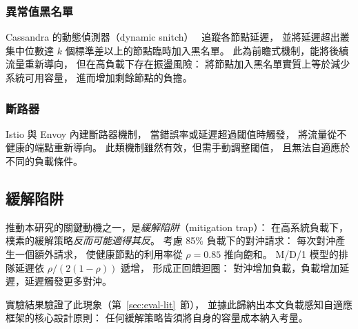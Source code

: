 \subsubsection*{異常值黑名單}

Cassandra 的動態偵測器（dynamic snitch）~\cite{lakshman2010cassandra}
追蹤各節點延遲，
並將延遲超出叢集中位數達 $k$ 個標準差以上的節點臨時加入黑名單。
此為前瞻式機制，能將後續流量重新導向，
但在高負載下存在振盪風險：
將節點加入黑名單實質上等於減少系統可用容量，
進而增加剩餘節點的負擔。

\subsubsection*{斷路器}

Istio 與 Envoy 內建斷路器機制，
當錯誤率或延遲超過閾值時觸發，
將流量從不健康的端點重新導向。
此類機制雖然有效，但需手動調整閾值，
且無法自適應於不同的負載條件。

\subsection{緩解陷阱}
\label{sec:trap}

推動本研究的關鍵動機之一，是\emph{緩解陷阱}（mitigation trap）：
在高系統負載下，
樸素的緩解策略\emph{反而可能適得其反}。
考慮 85\% 負載下的對沖請求：
每次對沖產生一個額外請求，
使健康節點的利用率從 $\rho = 0.85$ 推向飽和。
M/D/1 模型的排隊延遲依 $\rho/(2(1-\rho))$ 遞增，
形成正回饋迴圈：
對沖增加負載，負載增加延遲，延遲觸發更多對沖。

實驗結果驗證了此現象（第~\ref{sec:eval-lit}~節），
並據此歸納出本文負載感知自適應框架的核心設計原則：
任何緩解策略皆須將自身的容量成本納入考量。
